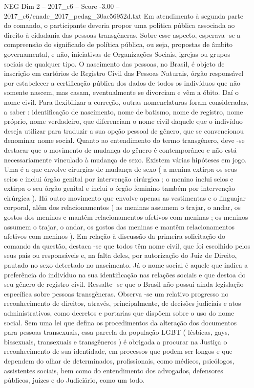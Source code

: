 \begin{textsample}{NEG Dim 2 – 2017\_c6 – Score -3.00 – 2017\_c6/enade\_2017\_pedag\_30ae56952d.txt}
Em atendimento à segunda parte do comando, o participante deveria propor uma política pública associada ao direito à cidadania das pessoas transgêneras.
Sobre esse aspecto, esperava -se a compreensão do significado de política pública, ou seja, propostas de âmbito governamental, e não, iniciativas de Organizações Sociais, igrejas ou grupos sociais de qualquer tipo.
O nascimento das pessoas, no Brasil, é objeto de inscrição em cartórios de Registro Civil das Pessoas Naturais, órgão responsável por estabelecer a certificação pública dos dados de todos os indivíduos que não somente nascem, mas casam, eventualmente se divorciam e vêm a óbito.
Daí o nome civil.
Para flexibilizar a correção, outras nomenclaturas foram consideradas, a saber : identificação de nascimento, nome de batismo, nome de registro, nome próprio, nome verdadeiro, que diferenciam o nome civil daquele que o indivíduo deseja utilizar para traduzir a sua opção pessoal de gênero, que se convencionou denominar nome social.
Quanto ao entendimento do termo transgênero, deve -se destacar que o movimento de mudança do gênero é contemporâneo e não está necessariamente vinculado à mudança de sexo.
Existem várias hipóteses em jogo.
Uma é a que envolve cirurgias de mudança de sexo ( a menina extirpa os seus seios e inclui órgão genital por intervenção cirúrgica ; o menino inclui seios e extirpa o seu órgão genital e inclui o órgão feminino também por intervenção cirúrgica ).
Há outro movimento que envolve apenas as vestimentas e o linguajar corporal, além dos relacionamentos ( as meninas assumem o trajar, o andar, os gostos dos meninos e mantêm relacionamentos afetivos com meninas ; os meninos assumem o trajar, o andar, os gostos das meninas e mantêm relacionamentos afetivos com meninos ).
Em relação à discussão da primeira solicitação do comando da questão, destaca -se que todos têm nome civil, que foi escolhido pelos seus pais ou responsáveis e, na falta deles, por autorização do Juiz de Direito, pautado no sexo detectado no nascimento.
Já o nome social é aquele que indica a preferência do indivíduo na sua identificação nas relações sociais e que destoa do seu gênero de registro civil.
Ressalte -se que o Brasil não possui ainda legislação específica sobre pessoas transgêneras.
Observa -se um relativo progresso no reconhecimento de direitos, através, principalmente, de decisões judiciais e atos administrativos, como decretos e portarias que dispõem sobre o uso do nome social.
Sem uma lei que defina os procedimentos da alteração dos documentos para pessoas transexuais, essa parcela da população LGBT ( lésbicas, gays, bissexuais, transexuais e transgêneros ) é obrigada a procurar na Justiça o reconhecimento de sua identidade, em processos que podem ser longos e que dependem do olhar de determinados, profissionais, como médicos, psicólogos, assistentes sociais, bem como do entendimento dos advogados, defensores públicos, juízes e do Judiciário, como um todo.

\end{textsample}
